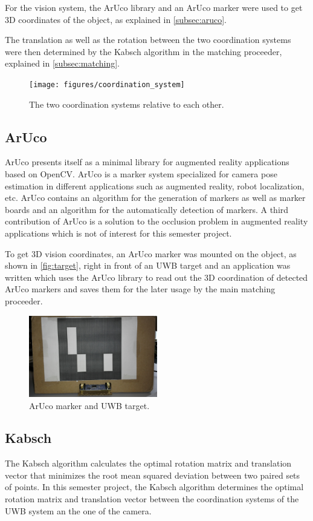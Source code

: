 For the vision system, the ArUco \cite{Aruco2014} library and an ArUco marker were used to get 3D coordinates of the object, as explained in \autoref{subsec:aruco}.

The translation as well as the rotation between the two coordination systems were then determined by the Kabsch algorithm \cite{Kabsch:a12999} in the matching proceeder, explained in \autoref{subsec:matching}.
\begin{figure}[h]\centering
	\texttt{[image: figures/coordination\_system]}
	\caption{The two coordination systems relative to each other.}\label{fig:coordinationsystem}
\end{figure}

\subsection{ArUco}\label{subsec:aruco}
ArUco \cite{Aruco2014} presents itself as a minimal library for augmented reality applications based on OpenCV. ArUco is a marker system specialized for camera pose estimation in different applications such as augmented reality, robot localization, etc. ArUco contains an algorithm for the generation of markers as well as marker boards and an algorithm for the automatically detection of markers. A third contribution of ArUco is a solution to the occlusion problem in augmented reality applications which is not of interest for this semester project.

To get 3D vision coordinates, an ArUco marker was mounted on the object, as shown in \autoref{fig:target}, right in front of an UWB target and an application was written which uses the ArUco library to read out the 3D coordination of detected ArUco markers and saves them for the later usage by the main matching proceeder.
\begin{figure}[h]\centering
	\includegraphics[width=0.5\textwidth]{figures/Box_cut.jpg}
	\caption{ArUco marker and UWB target.}\label{fig:target}
\end{figure}

\subsection{Kabsch}
The Kabsch algorithm \cite{Kabsch:a12999} calculates the optimal rotation matrix and translation vector that minimizes the root mean squared deviation between two paired sets of points. In this semester project, the Kabsch algorithm determines the optimal rotation matrix and translation vector between the coordination systems of the UWB system an the one of the camera.


